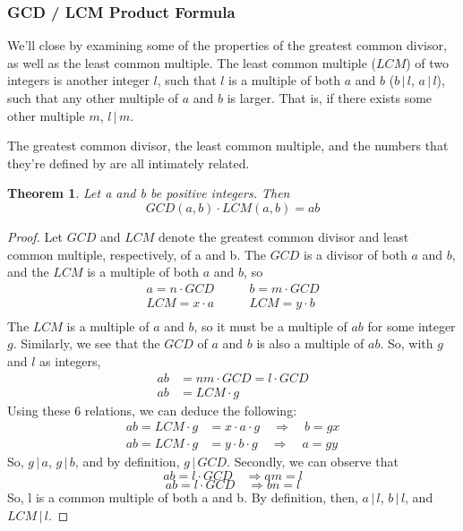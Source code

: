 \documentclass{article}
\newtheorem{theorem}{Theorem}
\newcommand{\divv}{\,|\,}
\begin{document}
\subsubsection*{GCD / LCM Product Formula} 

We’ll close by examining some of the properties of the greatest common divisor, as well as the least common multiple. 
The least common multiple ($LCM$) of two integers is another integer $l$, such that $l$ is a multiple of both $a$ and $b$ ($b\divv l$, $a\divv l$), such that any other multiple of $a$ and $b$ is larger. That is, if there exists some other multiple $m$, $l\divv m$. 

The greatest common divisor, the least common multiple, and the numbers that they’re defined by are all intimately related. 
\begin{mdframed} 
\begin{theorem} Let a and b be positive integers. Then 
	\[GCD(a, b) \cdot LCM(a, b) = ab\] 
\end{theorem} 
\begin{proof}  Let $GCD$ and $LCM$ denote the greatest common divisor and least common multiple, respectively, of a and b. The $GCD$ is a divisor of both $a$ and $b$, and the $LCM$ is a multiple of both $a$ and $b$, so 
\begin{align*} 
a = n\cdot GCD \quad&\quad b = m \cdot GCD \\  
LCM = x \cdot a \quad&\quad LCM = y \cdot b \\
\end{align*}
The $LCM$ is a multiple of $a$ and $b$, so it must be a multiple of $ab$ for some integer $g$. Similarly, we see that the $GCD$ of $a$ and $b$ is also a multiple of $ab$. So, with $g$ and $l$ as integers, 
\begin{align*}  
ab &= nm \cdot GCD = l \cdot GCD \\ 
ab &= LCM \cdot g 
\end{align*}
Using these  6 relations, we can deduce the following: 
\begin{align*}
ab = LCM \cdot g &= x \cdot a \cdot g  \quad \Rightarrow \quad  b = gx \\
ab = LCM \cdot g &= y \cdot b \cdot g  \quad \Rightarrow \quad  a = gy
\end{align*} 
So, $g\divv a$, $g\divv b$, and by definition, $g\divv GCD$. 
Secondly, we can observe that 
\[ab = l \cdot GCD \quad\Rightarrow am = l\] 
\[ab = l \cdot GCD \quad\Rightarrow  bn = l\] 
So, l is a common multiple of both a and b. By definition, then, $a\divv l$, $b\divv l$, and $LCM\divv l$. 

\end{proof}
\end{mdframed}
\end{document}
